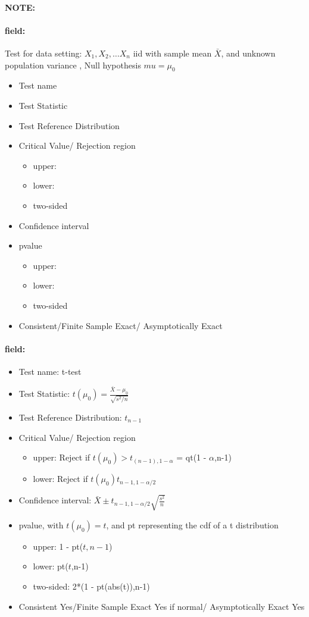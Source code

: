 \documentclass[12pt]{article}
\newenvironment{note}{\paragraph{NOTE:}}{}
\newenvironment{field}{\paragraph{field:}}{}
\begin{document}
\begin{note}
	\begin{field}
		Test for data setting: $X_1, X_2, \ldots X_n$ iid with sample mean $\bar{X}$, and unknown population variance , Null hypothesis $mu = \mu_0$
		\begin{itemize}
			\item Test name
			\item Test Statistic
			\item Test Reference Distribution
			\item Critical Value/ Rejection region
			      \begin{itemize}
				      \item upper:
				      \item lower:
				      \item two-sided
			      \end{itemize}
			\item Confidence interval
			\item pvalue
			      \begin{itemize}
				      \item upper:
				      \item lower:
				      \item two-sided
			      \end{itemize}
			\item Consistent/Finite Sample Exact/ Asymptotically Exact
		\end{itemize}
	\end{field}
	\begin{field}
		\begin{itemize}
			\item Test name: t-test
			\item Test Statistic: $t(\mu_0) = \frac{\bar{X} - \mu_0}{\sqrt{s^2/n}}$
			\item Test Reference Distribution: $t_{n-1}$
			\item Critical Value/ Rejection region
			      \begin{itemize}
				      \item upper: Reject if $t(\mu_0) > t_{(n-1),1-\alpha}$ = qt(1 - $\alpha$,n-1)
				      \item lower: Reject if $t(\mu_0)  t_{n-1,1-\alpha/2}$
			      \end{itemize}
			\item Confidence interval: $\bar{X} \pm t_{n-1,1-\alpha/2}\sqrt{\frac{s^2}{n}}$
			\item pvalue, with $t(\mu_0)  = t$, and pt representing the cdf of a t distribution
			      \begin{itemize}
				      \item upper: 1 - pt($t,n-1$)
				      \item lower: pt($t$,n-1)
				      \item two-sided: 2*(1 - pt(abs(t)),n-1)
			      \end{itemize}
			\item Consistent Yes/Finite Sample Exact Yes if normal/ Asymptotically Exact Yes
		\end{itemize}
	\end{field}
\end{note}
\end{document}
